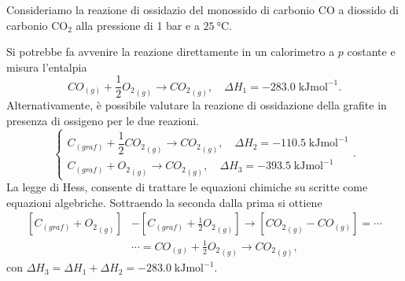 \begin{ex}
    Consideriamo la reazione di ossidazio del monossido di carbonio CO a diossido di carbonio $\text{CO}_2$ alla pressione di 1 bar e a $\SI{25}{\celsius}$. 
    
    Si potrebbe fa avvenire la reazione direttamente in un calorimetro a $p$ costante e misura l'entalpia
    \begin{equation}
        {CO}_{\left(g\right)}+\frac{1}{2}{O_2}_{\left(g\right)}\to{CO_2}_{\left(g\right)},\quad\Delta H_1=-283.0\;\mathrm{kJmol^{-1}}.
    \end{equation}
    Alternativamente, è possibile valutare la reazione di ossidazione della grafite in presenza di ossigeno per le due reazioni.
    \begin{equation}
            \begin{cases}
            C_{(graf)}+\dfrac{1}{2}{CO_2}_{\left(g\right)}\to {CO_2}_{\left(g\right)},\quad\Delta H_2=-110.5\; \mathrm{kJmol^{-1}} \\
            C_{(graf)}+{O_2}_{\left(g\right)}\to {CO_2}_{\left(g\right)},\quad\Delta H_3=-393.5 \;\mathrm{kJmol^{-1}}
        \end{cases}.
    \end{equation}
    La legge di Hess, consente di trattare le equazioni chimiche su scritte come equazioni algebriche. Sottraendo la seconda dalla prima si ottiene
    \begin{equation}
    \begin{aligned}
            [C_{(graf)}+{O_2}_{\left(g\right)}]&-[C_{(graf)}+\frac{1}{2}{O_2}_{\left(g\right)}]\to[{CO_2}_{\left(g\right)}-{CO}_{\left(g\right)}]=\cdots\\
            &\cdots={CO}_{\left(g\right)}+\frac{1}{2}{O_2}_{\left(g\right)}\to{CO_2}_{\left(g\right)},
    \end{aligned}    
    \end{equation}
    con $\Delta H_3=\Delta H_1+\Delta H_2=-283.0\;\mathrm{kJmol^{-1}}$.
\end{ex}

